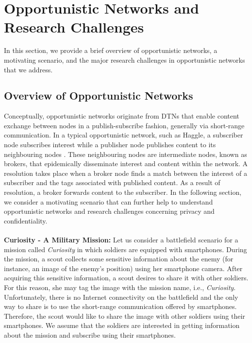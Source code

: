 \documentclass[epsfig,a4paper,11pt,titlepage]{book}
\numberwithin{algorithm}{chapter}
\begin{document}
\section{Opportunistic Networks and Research Challenges}
\label{sec:pidgin-overview-scenario-challenges}

In this section, we provide a brief overview of opportunistic networks, a motivating scenario, and the major research challenges in opportunistic networks that we address.

\subsection{Overview of Opportunistic Networks}
\label{sec:pidgin-overview}
Conceptually, opportunistic networks originate from \glspl{DTN} that enable content exchange between nodes in a publish-subscribe fashion, generally via short-range communication. In a typical opportunistic network, such as Haggle, a subscriber node subscribes interest while a publisher node publishes content to its neighbouring nodes \cite{Nordstrom:2009}. These neighbouring nodes are intermediate nodes, known as brokers, that epidemically disseminate interest and content within the network. A resolution takes place when a broker node finds a match between the interest of a subscriber and the tags associated with published content. 
As a result of resolution, a broker forwards content to the subscriber.
In the following section, we consider a motivating scenario that can further help to understand opportunistic networks and research challenges concerning privacy and confidentiality. \\ \\
\noindent \textbf{Curiosity - A Military Mission:} Let us consider a battlefield scenario for a mission called \emph{Curiosity} in which soldiers are equipped with smartphones. During the mission, a scout collects some sensitive information about the enemy (for instance, an image of the enemy's position) using her smartphone camera. After acquiring this sensitive information, a scout desires to share it with other soldiers. For this reason, she may tag the image with the mission name, i.e., \emph{Curiosity}. Unfortunately, there is no Internet connectivity on the battlefield and the only way to share is to use the short-range communication offered by smartphones. Therefore, the scout would like to share the image with other soldiers using their smartphones. We assume that the soldiers are interested in getting information about the mission and subscribe using their smartphones.
\end{document}
